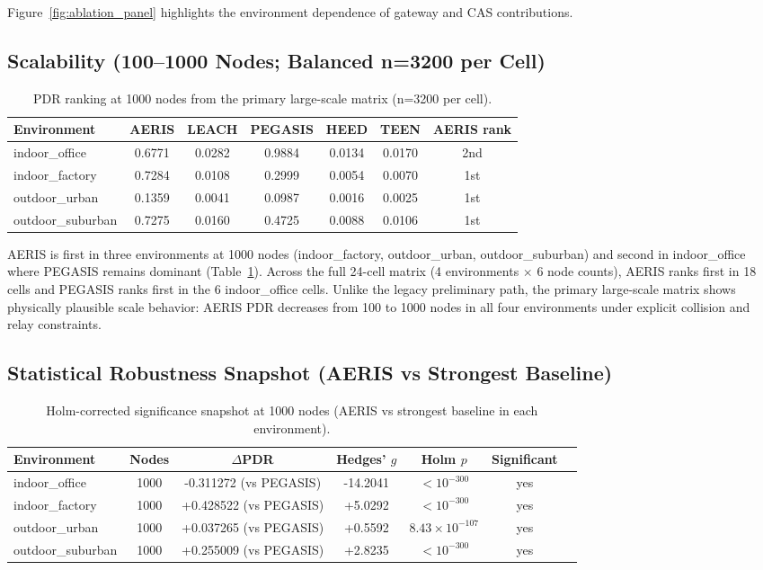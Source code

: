 ﻿\documentclass[sensors,article,submit,moreauthors,pdftex]{Definitions/mdpi}
\begin{document}
Figure~\ref{fig:ablation_panel} highlights the environment dependence of gateway and CAS contributions.

\subsection{Scalability (100--1000 Nodes; Balanced n=3200 per Cell)}
\begin{table}[H]
\caption{PDR ranking at 1000 nodes from the primary large-scale matrix (n=3200 per cell).}
\label{tab:scale1000}
\centering
\begin{tabular}{lcccccc}
\toprule
Environment & AERIS & LEACH & PEGASIS & HEED & TEEN & AERIS rank \\
\midrule
indoor\_office    & 0.6771 & 0.0282 & 0.9884 & 0.0134 & 0.0170 & 2nd \\
indoor\_factory   & 0.7284 & 0.0108 & 0.2999 & 0.0054 & 0.0070 & 1st \\
outdoor\_urban    & 0.1359 & 0.0041 & 0.0987 & 0.0016 & 0.0025 & 1st \\
outdoor\_suburban & 0.7275 & 0.0160 & 0.4725 & 0.0088 & 0.0106 & 1st \\
\bottomrule
\end{tabular}
\end{table}

AERIS is first in three environments at 1000 nodes (indoor\_factory, outdoor\_urban, outdoor\_suburban) and second in indoor\_office where PEGASIS remains dominant (Table~\ref{tab:scale1000}).
Across the full 24-cell matrix (4 environments $\times$ 6 node counts), AERIS ranks first in 18 cells and PEGASIS ranks first in the 6 indoor\_office cells.
Unlike the legacy preliminary path, the primary large-scale matrix shows physically plausible scale behavior: AERIS PDR decreases from 100 to 1000 nodes in all four environments under explicit collision and relay constraints.

\subsection{Statistical Robustness Snapshot (AERIS vs Strongest Baseline)}
\begin{table}[H]
\caption{Holm-corrected significance snapshot at 1000 nodes (AERIS vs strongest baseline in each environment).}
\label{tab:robust_snapshot}
\centering
\begin{tabular}{lcccccc}
\toprule
Environment & Nodes & $\Delta$PDR & Hedges' $g$ & Holm $p$ & Significant \\
\midrule
indoor\_office    & 1000 & -0.311272 (vs PEGASIS) & -14.2041 & $<10^{-300}$ & yes \\
indoor\_factory   & 1000 & +0.428522 (vs PEGASIS) & +5.0292 & $<10^{-300}$ & yes \\
outdoor\_urban    & 1000 & +0.037265 (vs PEGASIS) & +0.5592 & $8.43\times10^{-107}$ & yes \\
outdoor\_suburban & 1000 & +0.255009 (vs PEGASIS) & +2.8235 & $<10^{-300}$ & yes \\
\bottomrule
\end{tabular}
\end{table}
\end{document}
